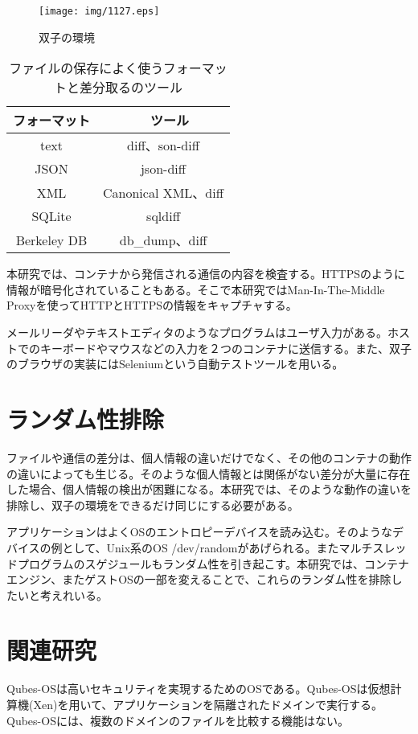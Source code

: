 \documentclass{ipsjpapers}
\begin{document}
\begin{figure}[t]
\begin{center}
\texttt{[image: img/1127.eps]}
\caption{双子の環境}
\label{figure:twin}
\end{center}
\end{figure}


\begin{table}
\centering
\caption{ファイルの保存によく使うフォーマットと差分取るのツール}
\begin{tabular}{ |c|c| }
 \hline
 フォーマット&　ツール\\
 \hline\hline
 text & diff、son-diff \\
 JSON & json-diff \\
 XML & Canonical XML、diff \\
 SQLite & sqldiff \\
 Berkeley DB & db\_dump、diff\\ 
 \hline
\end{tabular}
\end{table}

本研究では、コンテナから発信される通信の内容を検査する。HTTPSのように情報が暗号化されていることもある。そこで本研究ではMan-In-The-Middle Proxy\cite{mitm}を使ってHTTPとHTTPSの情報をキャプチャする。

メールリーダやテキストエディタのようなプログラムはユーザ入力がある。ホストでのキーボードやマウスなどの入力を２つのコンテナに送信する。また、双子のブラウザの実装にはSelenium\cite{selenium}という自動テストツールを用いる。





\section{ランダム性排除}
ファイルや通信の差分は、個人情報の違いだけでなく、その他のコンテナの動作の違いによっても生じる。そのような個人情報とは関係がない差分が大量に存在した場合、個人情報の検出が困難になる。本研究では、そのような動作の違いを排除し、双子の環境をできるだけ同じにする必要がある。

アプリケーションはよくOSのエントロピーデバイスを読み込む。そのようなデバイスの例として、Unix系のOS /dev/randomがあげられる。またマルチスレッドプログラムのスゲジュールもランダム性を引き起こす。本研究では、コンテナエンジン、またゲストOSの一部を変えることで、これらのランダム性を排除したいと考えれいる。

\section{関連研究}
Qubes-OS\cite{qubes}は高いセキュリティを実現するためのOSである。Qubes-OSは仮想計算機(Xen)を用いて、アプリケーションを隔離されたドメインで実行する。Qubes-OSには、複数のドメインのファイルを比較する機能はない。
\end{document}
